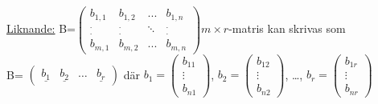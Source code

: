 \documentclass{article}
\begin{document}
        \underline{Liknande:} B=$\begin{pmatrix}
            b_{1,1} & b_{1,2} & ... & b_{1,n}\\
            ^{.}_{.} & ^{.}_{.} & \ddots & ^{.}_{.}\\
            b_{m,1} & b_{m,2} & ... & b_{m,n}
        \end{pmatrix} m\times r$-matris kan skrivas som\\
        B= $\begin{pmatrix}
            \underline{b_{1}} & \underline{b_{2}} & \ldots & \underline{b_{r}}
        \end{pmatrix}$ där $b_{1}=\begin{pmatrix}
            b_{11}\\\vdots\\b_{n1}
        \end{pmatrix}$, $b_{2}=\begin{pmatrix}
            b_{12}\\\vdots\\b_{n2}
        \end{pmatrix}$, \ldots, $b_{r}=\begin{pmatrix}
            b_{1r}\\\vdots\\b_{nr}
        \end{pmatrix}$\\\\
\end{document}
